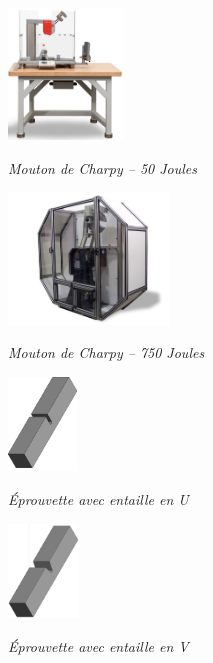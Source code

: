 \documentclass[11pt,oneside]{article}
\begin{document}
\begin{minipage}[c]{.2\linewidth}
\begin{center}
\includegraphics[height=3.5cm]{png/mouton_1}

\textit{Mouton de Charpy -- 50 Joules}
\end{center}
\end{minipage} \hfill
\begin{minipage}[c]{.2\linewidth}
\begin{center}
\includegraphics[height=3.5cm]{png/mouton_2}

\textit{Mouton de Charpy -- 750 Joules}
\end{center}
\end{minipage} \hfill
\begin{minipage}[c]{.2\linewidth}
\begin{center}
\includegraphics[height=2.5cm]{png/eprouvette_U}

\textit{Éprouvette avec entaille en U}
\end{center}
\end{minipage} \hfill
\begin{minipage}[c]{.2\linewidth}
\begin{center}
\includegraphics[height=2.5cm]{png/eprouvette_V}

\textit{Éprouvette avec entaille en V}
\end{center}
\end{minipage} 
\end{document}
